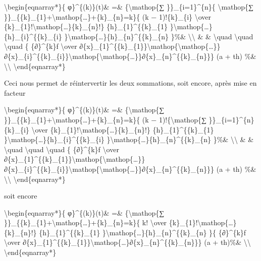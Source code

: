 \textbackslash{}begin\{eqnarray*\}\{ φ\}\^{}\{(k)\}(t)\& =\&
\{\textbackslash{}mathop\{∑ \}\}\_\{i=1\}\^{}\{n\}\{
\textbackslash{}mathop\{∑
\}\}\_\{\{k\}\_\{1\}+\textbackslash{}mathop\{\ldots{}\}+\{k\}\_\{n\}=k\}\{
(k − 1)!\{k\}\_\{i\} \textbackslash{}over
\{k\}\_\{1\}!\textbackslash{}mathop\{\ldots{}\}\{k\}\_\{n\}!\}
\{h\}\_\{1\}\^{}\{\{k\}\_\{1\}
\}\textbackslash{}mathop\{\ldots{}\}\{h\}\_\{i\}\^{}\{\{k\}\_\{i\}
\}\textbackslash{}mathop\{\ldots{}\}\{h\}\_\{n\}\^{}\{\{k\}\_\{n\}
\}\%\& \textbackslash{}\textbackslash{} \& \& \textbackslash{}quad
\textbackslash{}quad \textbackslash{}quad \{ \{∂\}\^{}\{k\}f
\textbackslash{}over
∂\{x\}\_\{1\}\^{}\{\{k\}\_\{1\}\}\textbackslash{}mathop\{\textbackslash{}mathop\{\ldots{}\}\}∂\{x\}\_\{i\}\^{}\{\{k\}\_\{i\}\}\textbackslash{}mathop\{\textbackslash{}mathop\{\ldots{}\}\}∂\{x\}\_\{n\}\^{}\{\{k\}\_\{n\}\}\}
(a + th) \%\& \textbackslash{}\textbackslash{}
\textbackslash{}end\{eqnarray*\}

Ceci nous permet de réintervertir les deux sommations, soit encore,
après mise en facteur

\textbackslash{}begin\{eqnarray*\}\{ φ\}\^{}\{(k)\}(t)\& =\&
\{\textbackslash{}mathop\{∑
\}\}\_\{\{k\}\_\{1\}+\textbackslash{}mathop\{\ldots{}\}+\{k\}\_\{n\}=k\}\{
(k − 1)!\{\textbackslash{}mathop\{∑ \}\}\_\{i=1\}\^{}\{n\}\{k\}\_\{i\}
\textbackslash{}over
\{k\}\_\{1\}!\textbackslash{}mathop\{\ldots{}\}\{k\}\_\{n\}!\}
\{h\}\_\{1\}\^{}\{\{k\}\_\{1\}
\}\textbackslash{}mathop\{\ldots{}\}\{h\}\_\{i\}\^{}\{\{k\}\_\{i\}
\}\textbackslash{}mathop\{\ldots{}\}\{h\}\_\{n\}\^{}\{\{k\}\_\{n\}
\}\%\& \textbackslash{}\textbackslash{} \& \& \textbackslash{}quad
\textbackslash{}quad \textbackslash{}quad \{ \{∂\}\^{}\{k\}f
\textbackslash{}over
∂\{x\}\_\{1\}\^{}\{\{k\}\_\{1\}\}\textbackslash{}mathop\{\textbackslash{}mathop\{\ldots{}\}\}∂\{x\}\_\{i\}\^{}\{\{k\}\_\{i\}\}\textbackslash{}mathop\{\textbackslash{}mathop\{\ldots{}\}\}∂\{x\}\_\{n\}\^{}\{\{k\}\_\{n\}\}\}
(a + th) \%\& \textbackslash{}\textbackslash{}
\textbackslash{}end\{eqnarray*\}

soit encore

\textbackslash{}begin\{eqnarray*\}\{ φ\}\^{}\{(k)\}(t)\& =\&
\{\textbackslash{}mathop\{∑
\}\}\_\{\{k\}\_\{1\}+\textbackslash{}mathop\{\ldots{}\}+\{k\}\_\{n\}=k\}\{
k! \textbackslash{}over
\{k\}\_\{1\}!\textbackslash{}mathop\{\ldots{}\}\{k\}\_\{n\}!\}
\{h\}\_\{1\}\^{}\{\{k\}\_\{1\}
\}\textbackslash{}mathop\{\ldots{}\}\{h\}\_\{n\}\^{}\{\{k\}\_\{n\} \}\{
\{∂\}\^{}\{k\}f \textbackslash{}over
∂\{x\}\_\{1\}\^{}\{\{k\}\_\{1\}\}\textbackslash{}mathop\{\ldots{}\}∂\{x\}\_\{n\}\^{}\{\{k\}\_\{n\}\}\}
(a + th)\%\& \textbackslash{}\textbackslash{}
\textbackslash{}end\{eqnarray*\}

